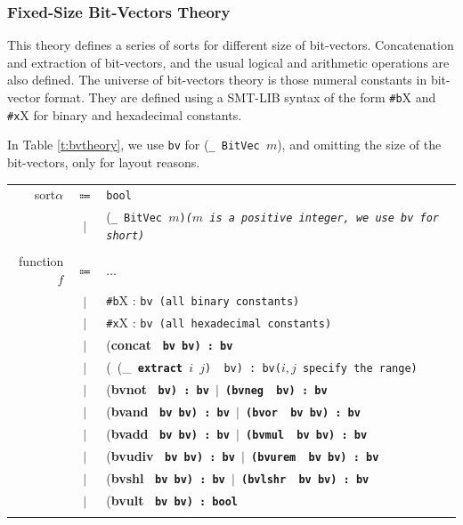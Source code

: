 \documentclass[10pt,letter]{article}
\theoremstyle{definition}
\begin{document}
\subsubsection{Fixed-Size Bit-Vectors Theory}
This theory defines a series of sorts for different size of bit-vectors. Concatenation and extraction of bit-vectors, and the usual logical and arithmetic operations are also defined. The universe of bit-vectors theory is those numeral constants in bit-vector format. They are defined using a SMT-LIB syntax of the form {\tt \#b}X and {\tt \#x}X for binary and hexadecimal constants.

In Table \ref{t:bvtheory}, we use {\tt bv} for ({\tt \_\ BitVec $m$}), and omitting the size of the bit-vectors, only for layout reasons.


\begin{table}[!h]
\begin{mdframed}
\centering
\begin{tabular}{r c l}
sort\qquad $\alpha$ & $\Coloneqq$ & \tt bool \\
& $\mid$ & \rm(\tt \_\ BitVec $m$\rm)\it\quad \rm($m$ \rm is a positive integer, we use {\tt bv} for short)\\
\\
function\qquad $f$ & $\Coloneqq$ & $\ldots$ \\
& $\mid$ & {\tt \#b}X \rm : \tt bv \rm\qquad (all binary constants)\\
& $\mid$ & {\tt \#x}X \rm : \tt bv \rm\qquad (all hexadecimal constants)\\
& $\mid$ & (\bf concat \tt\ bv bv\rm) : \tt bv \\
& $\mid$ & \rm(\ (\_\tt\ {\bf extract}\ $i$\ $j$\rm) \tt\ bv\rm) : \tt bv\rm\qquad ($i, j$ specify the range)\\
& $\mid$ & (\bf bvnot \tt\ bv\rm) : \tt bv \rm$\mid$ (\bf bvneg \tt\ bv\rm) : \tt bv \\
& $\mid$ & (\bf bvand \tt\ bv bv\rm) : \tt bv \rm$\mid$ (\bf bvor \tt\ bv bv\rm) : \tt bv \\
& $\mid$ & (\bf bvadd \tt\ bv bv\rm) : \tt bv \rm$\mid$ (\bf bvmul \tt\ bv bv\rm) : \tt bv \\
& $\mid$ & (\bf bvudiv \tt\ bv bv\rm) : \tt bv \rm$\mid$ (\bf bvurem \tt\ bv bv\rm) : \tt bv \\
& $\mid$ & (\bf bvshl \tt\ bv bv\rm) : \tt bv \rm$\mid$ (\bf bvlshr \tt\ bv bv\rm) : \tt bv \\
& $\mid$ & (\bf bvult \tt\ bv bv\rm) : \tt bool \\
\\

\end{tabular}
\end{mdframed}
\end{table}
\end{document}
